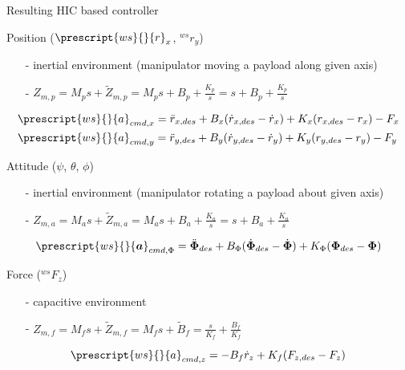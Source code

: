 \begin{frame}[shrink=30]{Resulting HIC based controller}
  \begin{block}{Position ($\prescript{ws}{}{r}_x$, ${}^{ws}r_y$)}
  \begin{itemize}
  \item[-] inertial environment (manipulator moving a payload along given axis)
  \item[-] $Z_{m,p} = M_p s + \tilde{Z}_{m,p} = M_p s + B_p + \frac{K_p}{s} = s + B_p + \frac{K_p}{s} $
  \end{itemize}
  \[
  \begin{split}
    & \prescript{ws}{}{a}_{cmd,x} = \ddot{r}_{x,des} + B_x (\dot{r}_{x,des} - \dot{r}_x) + K_x (r_{x,des} - r_x) - F_x \\
    & \prescript{ws}{}{a}_{cmd,y} = \ddot{r}_{y,des} + B_y (\dot{r}_{y,des} - \dot{r}_y) + K_y (r_{y,des} - r_y) - F_y
    \end{split}
  \]
  \end{block}
  \begin{block}{Attitude ($\psi$, $\theta$, $\phi$)}
    \begin{itemize}
    \item[-] inertial environment (manipulator rotating a payload about given axis)
    \item[-] $Z_{m,a} = M_a s + \tilde{Z}_{m,a} = M_a s + B_a + \frac{K_a}{s} = s + B_a + \frac{K_a}{s}$
    \end{itemize}
    \[ 
    \prescript{ws}{}{\vec{a}}_{cmd,\Phi} = \ddot{\vec{\Phi}}_{des} + B_{\Phi} (\dot{\vec{\Phi}}_{des} - \dot{\vec{\Phi}}) + K_{\Phi} (\vec{\Phi}_{des} - \vec{\Phi})
    \]
  \end{block}
  \begin{block}{Force (${}^{ws}F_z$)}
    \begin{itemize}
    \item[-] capacitive environment
    \item[-] $Z_{m,f} = M_f s + \tilde{Z}_{m,f} = M_f s + \tilde{B}_f = \frac{s}{K_f} + \frac{B_f}{K_f}$
    \end{itemize}
    \[
    \prescript{ws}{}{a}_{cmd,z} = - B_f \dot{r}_z + K_f(F_{z,des} - F_z)
    \]  
  \end{block}
\end{frame}

